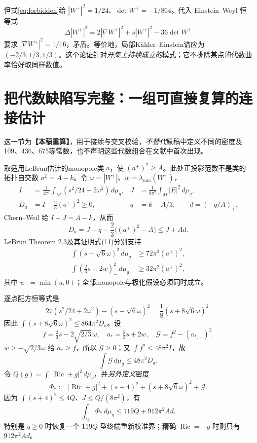\documentclass[UTF8,a4paper,11pt,fontset=fandol]{ctexart}
\numberwithin{equation}{section}
\theoremstyle{definition}
\newcommand{\Ric}{\operatorname{Ric}}
\newcommand{\dd}{\,d\mu_g}
\newcommand{\status}[1]{\textbf{【#1】}}
\begin{document}
但式\eqref{eq:forbidden}给 $|W^+|^2=1/24$、$\det W^+=-1/864$。代入 Einstein--Weyl 恒等式
\[
\Delta|W^+|^2=2|\nabla W^+|^2+s|W^+|^2-36\det W^+
\]
要求 $|\nabla W^+|^2=1/16$，矛盾。等价地，局部K\"ahler--Einstein谱应为 $(-2/3,1/3,1/3)$。这个论证针对\emph{开集上持续成立的}模式；它不排除某点的代数曲率恰好取同样数值。

\section{把代数缺陷写完整：一组可直接复算的连接估计}
这一节为\status{本稿重算}，用于接续与交叉校验，\emph{不替代}原稿中定义不同的密度及109、436、675等常数，也不声明这些代数组合在文献中首次出现。

取适用LeBrun估计的monopole类 $a$，使 $(a^+)^2\ge A$。此处正投影范数不是类的拓扑自交数 $a^2=A-k$。令 $\omega=|W^+|$、$w=\lambda_{\min}(W^+)$，
\begin{align}
 I&=\frac1{4\pi^2}\int_M(s^2/24+2\omega^2)\dd,
 &J&=\frac1{8\pi^2}\int_M|E|^2\dd,\\
 D_a&=I-\frac23(a^+)^2\ge0,
 &q&=k-A/3,\qquad d=(-q/A)_+.
\end{align}
Chern--Weil 给 $I-J=A-k$，从而
\begin{equation}\label{eq:Da}
D_a=J-q-\frac23\big((a^+)^2-A\big)\le J+Ad.
\end{equation}
LeBrun Theorem 2.3及其证明式(11)分别支持
\begin{align}
\int(s-\sqrt6\omega)^2\dd&\ge72\pi^2(a^+)^2,\\
\int\left(\frac23s+2w\right)_{-}^{\!2}\dd&\ge32\pi^2(a^+)^2,
\end{align}
其中 $u_-=\min(u,0)$；全部monopole与极化假设必须同时成立\cite{LeBrun2001}。

逐点配方恒等式是
\begin{equation}\label{eq:square}
27(s^2/24+2\omega^2)-(s-\sqrt6\omega)^2
=\frac18(s+8\sqrt6\omega)^2.
\end{equation}
因此 $\int(s+8\sqrt6\omega)^2\le864\pi^2D_a$。设
\[
f=\tfrac23s-2\sqrt{2/3}\,\omega,\quad a_*=\tfrac23s+2w,
\quad\mathcal G=f^2-(a_{*,-})^2.
\]
$w\ge-\sqrt{2/3}\omega$ 给 $a_*\ge f$，所以 $\mathcal G\ge0$；又 $\int f^2\le48\pi^2I$，故
\begin{equation}
\int\mathcal G\dd\le48\pi^2D_a.
\end{equation}
令 $Q(g)=\int|\Ric+g|^2\dd$，并\emph{另外定义}密度
\begin{equation}\label{eq:Phistar}
\Phi_*:=|\Ric+g|^2+(s+4)^2+(s+8\sqrt6\omega)^2+\mathcal G.
\end{equation}
因为 $\int(s+4)^2\le4Q$、$J\le Q/(8\pi^2)$，有
\begin{equation}\label{eq:119}
\boxed{\int_M\Phi_*\dd\le119Q+912\pi^2 A d.}
\end{equation}
特别是 $q\ge0$ 时恢复一个 $119Q$ 型终端重新校准界；精确 $\Ric=-g$ 时则只有 $912\pi^2Ad$。
\end{document}
